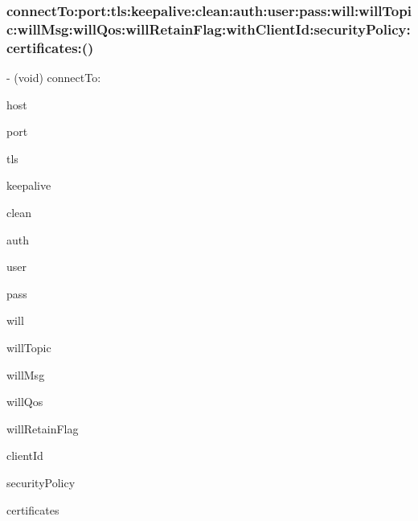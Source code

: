\subsubsection{\texorpdfstring{connect\+To\+:port\+:tls\+:keepalive\+:clean\+:auth\+:user\+:pass\+:will\+:will\+Topic\+:will\+Msg\+:will\+Qos\+:will\+Retain\+Flag\+:with\+Client\+Id\+:security\+Policy\+:certificates\+:()}{connectTo:port:tls:keepalive:clean:auth:user:pass:will:willTopic:willMsg:willQos:willRetainFlag:withClientId:securityPolicy:certificates:()}}
{\footnotesize\ttfamily -\/ (void) connect\+To\+: \begin{DoxyParamCaption}\item[{(N\+S\+String $\ast$)}]{host }\item[{port:(N\+S\+Integer)}]{port }\item[{tls:(B\+O\+OL)}]{tls }\item[{keepalive:(N\+S\+Integer)}]{keepalive }\item[{clean:(B\+O\+OL)}]{clean }\item[{auth:(B\+O\+OL)}]{auth }\item[{user:(N\+S\+String $\ast$)}]{user }\item[{pass:(N\+S\+String $\ast$)}]{pass }\item[{will:(B\+O\+OL)}]{will }\item[{willTopic:(N\+S\+String $\ast$)}]{will\+Topic }\item[{willMsg:(N\+S\+Data $\ast$)}]{will\+Msg }\item[{willQos:(M\+Q\+T\+T\+Qos\+Level)}]{will\+Qos }\item[{willRetainFlag:(B\+O\+OL)}]{will\+Retain\+Flag }\item[{withClientId:(N\+S\+String $\ast$)}]{client\+Id }\item[{securityPolicy:(\hyperlink{interface_m_q_t_t_s_s_l_security_policy}{M\+Q\+T\+T\+S\+S\+L\+Security\+Policy} $\ast$)}]{security\+Policy }\item[{certificates:(N\+S\+Array $\ast$)}]{certificates }\end{DoxyParamCaption}}


